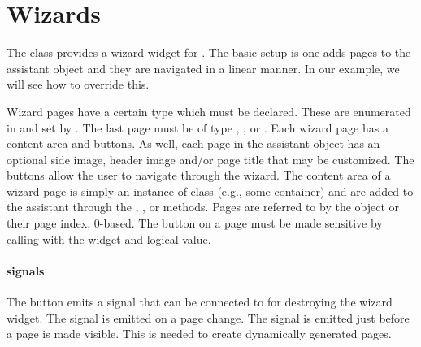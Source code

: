 \section{Wizards}
\label{sec:gtk-wizards}

The  class provides a wizard widget for \GTK. The
basic setup is one adds pages to the assistant object and they are
navigated in a linear manner. In our example, we will see how to
override this. 


Wizard pages have a certain type which must be declared. These are
enumerated in  and set by . The last page must be of
type , , or .
Each wizard page has a content area and buttons.  As well, each page
in the assistant object has an optional side image, header image
and/or page title that may be customized. The buttons allow the user
to navigate through the wizard. The content area of a wizard page is
simply an instance of class  (e.g., some container) and are
added to the assistant through the ,
, or
 methods. Pages are referred to by
the  object or their page index, $0$-based. The
 button on a page must be made sensitive by calling
 with the widget and logical
value.

\paragraph{signals}
The  button emits a  signal that can be
connected to for destroying the wizard widget. The 
signal is emitted on a page change. The  signal is
emitted just before a page is made visible. This is needed to create
dynamically generated pages.

